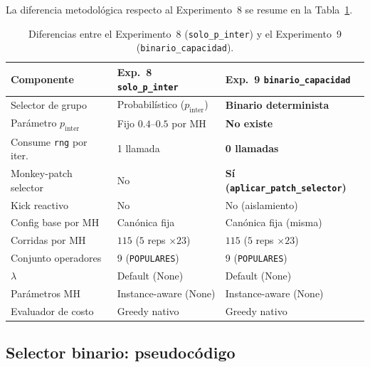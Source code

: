 La diferencia metodológica respecto al Experimento~8 se resume en la
Tabla~\ref{tab:comparativa-approaches-binario-capacidad}.

\begin{table}[h]
\centering
\caption{Diferencias entre el Experimento~8 (\texttt{solo\_p\_inter})
         y el Experimento~9 (\texttt{binario\_capacidad}).}
\label{tab:comparativa-approaches-binario-capacidad}
\small
\begin{tabular}{lll}
\toprule
Componente & Exp.~8 \texttt{solo\_p\_inter} & Exp.~9 \texttt{binario\_capacidad} \\
\midrule
Selector de grupo        & Probabilístico ($p_{\text{inter}}$)   & \textbf{Binario determinista} \\
Parámetro $p_{\text{inter}}$ & Fijo $0.4$--$0.5$ por MH          & \textbf{No existe} \\
Consume \texttt{rng} por iter. & 1 llamada                        & \textbf{0 llamadas} \\
Monkey-patch selector    & No                                    & \textbf{Sí (\texttt{aplicar\_patch\_selector})} \\
Kick reactivo            & No                                    & No (aislamiento) \\
Config base por MH       & Canónica fija                         & Canónica fija (misma) \\
Corridas por MH          & $115$ ($5$ reps $\times 23$)          & $115$ ($5$ reps $\times 23$) \\
Conjunto operadores      & 9 (\texttt{POPULARES})                & 9 (\texttt{POPULARES}) \\
$\lambda$                & Default (None)                        & Default (None) \\
Parámetros MH            & Instance-aware (None)                 & Instance-aware (None) \\
Evaluador de costo       & Greedy nativo                         & Greedy nativo \\
\bottomrule
\end{tabular}
\end{table}

\subsection{Selector binario: pseudocódigo}
\label{subsec:selector-binario-capacidad}

